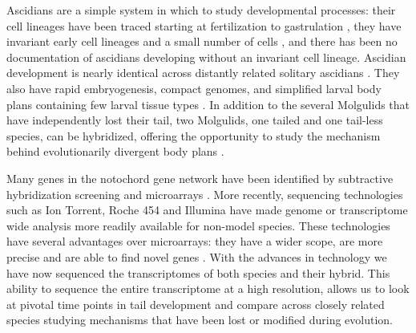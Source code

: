 Ascidians are a simple system in which to study developmental processes: their cell lineages have been traced starting at fertilization \cite{nishida_cell_1983} to gastrulation \cite{nishida_cell_1985,nishida_cell_1987}, they have invariant early cell lineages and a small number of cells \cite{lemaire_evolutionary_2011}, and there has been no documentation of ascidians developing without an invariant cell lineage.  Ascidian development is nearly identical across distantly related solitary ascidians \cite{lemaire_ascidians_2008,nishida_cell_2014}. They also have rapid embryogenesis, compact genomes, and simplified larval body plans containing few larval tissue types \cite{corbo_characterization_1997,jeffery_minireview_2002,dehal_draft_2002}.  %
In addition to the several Molgulids that have independently lost their tail, two Molgulids, one tailed and one tail-less species, can be hybridized, offering the opportunity to study the mechanism behind evolutionarily divergent body plans \cite{jeffery_evolutionary_1991}. %

Many genes in the notochord gene network have been identified by subtractive hybridization screening and microarrays \cite{jeffery_factors_1992,hotta_characterization_2000,gyoja_analysis_2007,kobayashi_differential_2013}. More recently, sequencing technologies such as Ion Torrent, Roche 454 and Illumina have made genome or transcriptome wide analysis more readily available for non-model species. These technologies have several advantages over microarrays: they have a wider scope, are more precise and are able to find novel genes \cite{marioni_rna-seq:_2008}. With the advances in technology we have now sequenced the transcriptomes of both species and their hybrid. This ability to sequence the entire transcriptome at a high resolution, allows us to look at pivotal time points in tail development and compare across closely related species studying mechanisms that have been lost or modified during evolution. 

